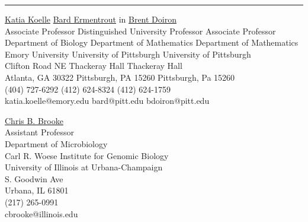 \documentclass[a4paper,10pt]{article}
\newlength{\cvcolumngapwidth}
\newlength{\cvleftcolumnwidth}
\newlength{\cvrightcolumnwidth}
\newcommand{\cvsectionstyle}[1]{{\normalsize\cvsectionfont\textcolor{cvsectioncolor}{#1}}}
\newlength{\cvaftersectionskipamount}
\newcommand{\cvsection}[1]{
    \begin{minipage}[t]{\cvleftcolumnwidth}
        \raggedleft\cvsectionstyle{#1}
    \end{minipage}%
    \hspace{\cvcolumngapwidth}%
    \begin{minipage}[t]{\cvrightcolumnwidth}
        \textcolor{cvrulecolor}{\rule{\cvrightcolumnwidth}{0.3mm}}
    \end{minipage}

    \vspace{\cvaftersectionskipamount}
}
\begin{document}
\cvsection{REFERENCES}

\begin{tabbing}
\hskip 1in \= \href{https://scholarblogs.emory.edu/koellelab/}{Katia Koelle}              \hskip 1in \= \href{https://www.pitt.edu/~phase/}{Bard Ermentrout}      in \= \href{http://www.math.pitt.edu/~bdoiron/}{Brent Doiron} \\    
\>  Associate Professor													\> Distinguished University Professor			\> Associate Professor\\
\> Department of Biology           											\> Department of Mathematics			        		\>  Department of Mathematics\\
\> Emory University	            												\> University of Pittsburgh 				        \> University of Pittsburgh \\
 Clifton Road NE                											\> 301 Thackeray Hall				                  Thackeray Hall    \\
\> Atlanta, GA 30322														\> Pittsburgh, PA  15260                     			\> Pittsburgh, Pa 15260  \\
\> (404) 727-6292														\> (412) 624-8324        			                 	\>  (412) 624-1759 \\   
\> katia.koelle@emory.edu												\> bard@pitt.edu                       	    				\> bdoiron@pitt.edu \\
\end{tabbing}

\begin{tabbing}
\hskip 1in \= \href{https://scholarblogs.emory.edu/koellelab/}{Chris B. Brooke} \\
\>  Assistant Professor \\
\> Department of Microbiology \\
\> Carl R. Woese Institute for Genomic Biology \\
\> University of Illinois at Urbana-Champaign \\	      
 S. Goodwin Ave \\
\> Urbana, IL 61801 \\
\> (217) 265-0991 \\
\> cbrooke@illinois.edu \\
\end{tabbing}
\end{document}
